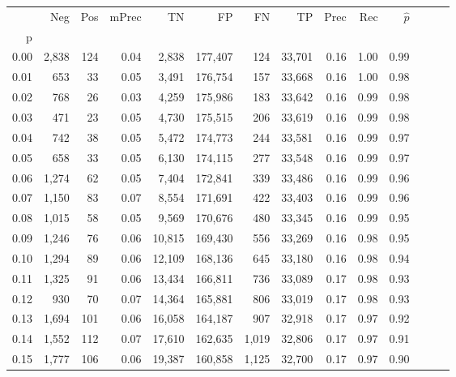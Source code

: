 \begin{tabular}{rrrrrrrrrrrrrr}
\toprule
{} &    Neg &  Pos & mPrec &       TN &       FP &      FN &      TP &  Prec &   Rec & $\hat{p}$ \\
p    &        &      &       &          &          &         &         &       &       &           \\
\midrule
0.00 &  2,838 &  124 &  0.04 &    2,838 &  177,407 &     124 &  33,701 &  0.16 &  1.00 &      0.99 \\
0.01 &    653 &   33 &  0.05 &    3,491 &  176,754 &     157 &  33,668 &  0.16 &  1.00 &      0.98 \\
0.02 &    768 &   26 &  0.03 &    4,259 &  175,986 &     183 &  33,642 &  0.16 &  0.99 &      0.98 \\
0.03 &    471 &   23 &  0.05 &    4,730 &  175,515 &     206 &  33,619 &  0.16 &  0.99 &      0.98 \\
0.04 &    742 &   38 &  0.05 &    5,472 &  174,773 &     244 &  33,581 &  0.16 &  0.99 &      0.97 \\
0.05 &    658 &   33 &  0.05 &    6,130 &  174,115 &     277 &  33,548 &  0.16 &  0.99 &      0.97 \\
0.06 &  1,274 &   62 &  0.05 &    7,404 &  172,841 &     339 &  33,486 &  0.16 &  0.99 &      0.96 \\
0.07 &  1,150 &   83 &  0.07 &    8,554 &  171,691 &     422 &  33,403 &  0.16 &  0.99 &      0.96 \\
0.08 &  1,015 &   58 &  0.05 &    9,569 &  170,676 &     480 &  33,345 &  0.16 &  0.99 &      0.95 \\
0.09 &  1,246 &   76 &  0.06 &   10,815 &  169,430 &     556 &  33,269 &  0.16 &  0.98 &      0.95 \\
0.10 &  1,294 &   89 &  0.06 &   12,109 &  168,136 &     645 &  33,180 &  0.16 &  0.98 &      0.94 \\
0.11 &  1,325 &   91 &  0.06 &   13,434 &  166,811 &     736 &  33,089 &  0.17 &  0.98 &      0.93 \\
0.12 &    930 &   70 &  0.07 &   14,364 &  165,881 &     806 &  33,019 &  0.17 &  0.98 &      0.93 \\
0.13 &  1,694 &  101 &  0.06 &   16,058 &  164,187 &     907 &  32,918 &  0.17 &  0.97 &      0.92 \\
0.14 &  1,552 &  112 &  0.07 &   17,610 &  162,635 &   1,019 &  32,806 &  0.17 &  0.97 &      0.91 \\
0.15 &  1,777 &  106 &  0.06 &   19,387 &  160,858 &   1,125 &  32,700 &  0.17 &  0.97 &      0.90 \\

\end{tabular}
